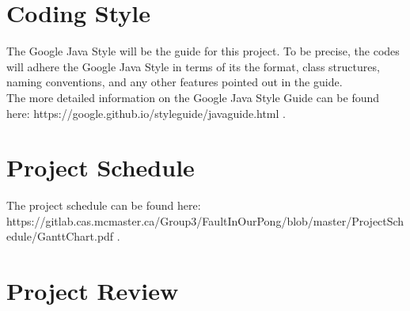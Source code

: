 \documentclass{article}
\begin{document}
\section {Coding Style}
The Google Java Style will be the guide for this project. To be precise, the codes will adhere the Google Java Style in terms of its the format, class structures, naming conventions, and any other features pointed out in the guide.\\

The more detailed information on the Google Java Style Guide can be found here: https://google.github.io/styleguide/javaguide.html . \\


\section {Project Schedule}

The project schedule can be found here: \\
https://gitlab.cas.mcmaster.ca/Group3/FaultInOurPong/blob/master/ProjectSchedule/GanttChart.pdf . 


\section {Project Review} 
\end{document}
